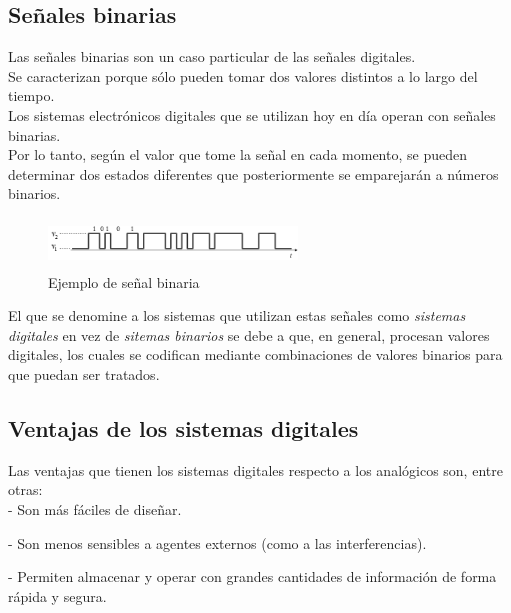 \documentclass[12pt]{article}
\begin{document}
			\newpage
	
		\subsection{Señales binarias}
	
			Las señales binarias son un caso particular de las señales digitales.\\
			
			Se caracterizan porque sólo pueden tomar dos valores distintos a lo largo del tiempo.\\
	
			Los sistemas electrónicos digitales que se utilizan hoy en día operan con señales binarias.\\
			
			Por lo tanto, según el valor que tome la señal en cada momento, se pueden determinar dos estados diferentes que posteriormente se emparejarán a números binarios.\\
			
			\begin{figure}[H]
			\centering
			\includegraphics[width=250px,height=50px]{binary}
			\caption{Ejemplo de señal binaria}
			\end{figure}
			
			El que se denomine a los sistemas que utilizan estas señales como \textit{sistemas digitales} en vez de \textit{sitemas binarios} se debe a que, en general, procesan valores digitales, los cuales se codifican mediante combinaciones de valores binarios para que puedan ser tratados.\\
			
		\subsection{Ventajas de los sistemas digitales}
		
			Las ventajas que tienen los sistemas digitales respecto a los analógicos son, entre otras:\\
			
			- Son más fáciles de diseñar.
			
			- Son menos sensibles a agentes externos (como a las interferencias).
			
			- Permiten almacenar y operar con grandes cantidades de información de forma rápida y segura.
			
\end{document}
